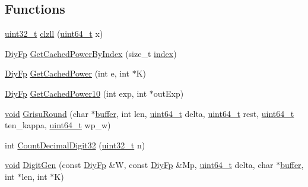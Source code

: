 \subsection*{Functions}
\begin{DoxyCompactItemize}
\item 
\hyperlink{stdint_8h_a435d1572bf3f880d55459d9805097f62}{uint32\+\_\+t} \hyperlink{namespaceinternal_af72bbb0200bf0166f728c7afde826286}{clzll} (\hyperlink{stdint_8h_aec6fcb673ff035718c238c8c9d544c47}{uint64\+\_\+t} x)
\item 
\hyperlink{structinternal_1_1DiyFp}{Diy\+Fp} \hyperlink{namespaceinternal_a3e95f043ed6c40cda1c1bc33c2f0ece2}{Get\+Cached\+Power\+By\+Index} (size\+\_\+t \hyperlink{imgui__impl__opengl3__loader_8h_a57f14e05b1900f16a2da82ade47d0c6d}{index})
\item 
\hyperlink{structinternal_1_1DiyFp}{Diy\+Fp} \hyperlink{namespaceinternal_abac3dbfa1070756c37725829148f6038}{Get\+Cached\+Power} (int e, int $\ast$K)
\item 
\hyperlink{structinternal_1_1DiyFp}{Diy\+Fp} \hyperlink{namespaceinternal_a74b8503d044bf6c0a5e90c5bea3aba42}{Get\+Cached\+Power10} (int exp, int $\ast$out\+Exp)
\item 
\hyperlink{imgui__impl__opengl3__loader_8h_ac668e7cffd9e2e9cfee428b9b2f34fa7}{void} \hyperlink{namespaceinternal_a234e10bef097ccb2f202b7a133086e71}{Grisu\+Round} (char $\ast$\hyperlink{imgui__impl__opengl3__loader_8h_a3667f558219c90437106b544a3ca00b8}{buffer}, int len, \hyperlink{stdint_8h_aec6fcb673ff035718c238c8c9d544c47}{uint64\+\_\+t} delta, \hyperlink{stdint_8h_aec6fcb673ff035718c238c8c9d544c47}{uint64\+\_\+t} rest, \hyperlink{stdint_8h_aec6fcb673ff035718c238c8c9d544c47}{uint64\+\_\+t} ten\+\_\+kappa, \hyperlink{stdint_8h_aec6fcb673ff035718c238c8c9d544c47}{uint64\+\_\+t} wp\+\_\+w)
\item 
int \hyperlink{namespaceinternal_a8aae11dbb46da9ac99e116aa2a6dbfc9}{Count\+Decimal\+Digit32} (\hyperlink{stdint_8h_a435d1572bf3f880d55459d9805097f62}{uint32\+\_\+t} n)
\item 
\hyperlink{imgui__impl__opengl3__loader_8h_ac668e7cffd9e2e9cfee428b9b2f34fa7}{void} \hyperlink{namespaceinternal_a47be9aea8d0f9cae49dc03dc046d2450}{Digit\+Gen} (const \hyperlink{structinternal_1_1DiyFp}{Diy\+Fp} \&W, const \hyperlink{structinternal_1_1DiyFp}{Diy\+Fp} \&Mp, \hyperlink{stdint_8h_aec6fcb673ff035718c238c8c9d544c47}{uint64\+\_\+t} delta, char $\ast$\hyperlink{imgui__impl__opengl3__loader_8h_a3667f558219c90437106b544a3ca00b8}{buffer}, int $\ast$len, int $\ast$K)
\item 

\end{DoxyCompactItemize}
